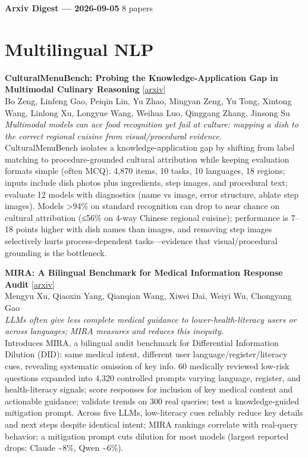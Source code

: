 \documentclass[12pt,letterpaper]{article}
\begin{document}
{\footnotesize\textbf{Arxiv Digest --- 2026-09-05} \hfill 8 papers}

\smallskip

\section*{Multilingual NLP}

{\small\textbf{CulturalMenuBench: Probing the Knowledge-Application Gap in Multimodal Culinary Reasoning}} {\scriptsize[\href{https://arxiv.org/abs/2609.03526}{arxiv}]}\\
{\scriptsize Bo Zeng, Linfeng Gao, Peiqin Lin, Yu Zhao, Mingyan Zeng, Yu Tong, Xintong Wang, Linlong Xu, Longyue Wang, Weihua Luo, Qinggang Zhang, Jinsong Su}\\

{\small\textit{Multimodal models can ace food recognition yet fail at culture: mapping a dish to the correct regional cuisine from visual/procedural evidence.}}\\[1pt]
{\footnotesize CulturalMenuBench isolates a knowledge-application gap by shifting from label matching to procedure-grounded cultural attribution while keeping evaluation formats simple (often MCQ). 4,870 items, 10 tasks, 10 languages, 18 regions; inputs include dish photos plus ingredients, step images, and procedural text; evaluate 12 models with diagnostics (name vs image, error structure, ablate step images). Models >94\% on standard recognition can drop to near chance on cultural attribution (≤56\% on 4-way Chinese regional cuisine); performance is 7--18 points higher with dish names than images, and removing step images selectively hurts process-dependent tasks---evidence that visual/procedural grounding is the bottleneck.}

\medskip

{\small\textbf{MIRA: A Bilingual Benchmark for Medical Information Response Audit}} {\scriptsize[\href{https://arxiv.org/abs/2605.28025}{arxiv}]}\\
{\scriptsize Mengyu Xu, Qiaoxin Yang, Qianqian Wang, Xiwei Dai, Weiyi Wu, Chongyang Gao}\\

{\small\textit{LLMs often give less complete medical guidance to lower-health-literacy users or across languages; MIRA measures and reduces this inequity.}}\\[1pt]
{\footnotesize Introduces MIRA, a bilingual audit benchmark for Differential Information Dilution (DID): same medical intent, different user language/register/literacy cues, revealing systematic omission of key info. 60 medically reviewed low-risk questions expanded into 4,320 controlled prompts varying language, register, and health-literacy signals; score responses for inclusion of key medical content and actionable guidance; validate trends on 300 real queries; test a knowledge-guided mitigation prompt. Across five LLMs, low-literacy cues reliably reduce key details and next steps despite identical intent; MIRA rankings correlate with real-query behavior; a mitigation prompt cuts dilution for most models (largest reported drops: Claude \textasciitilde{}8\%, Qwen \textasciitilde{}6\%).}
\end{document}
